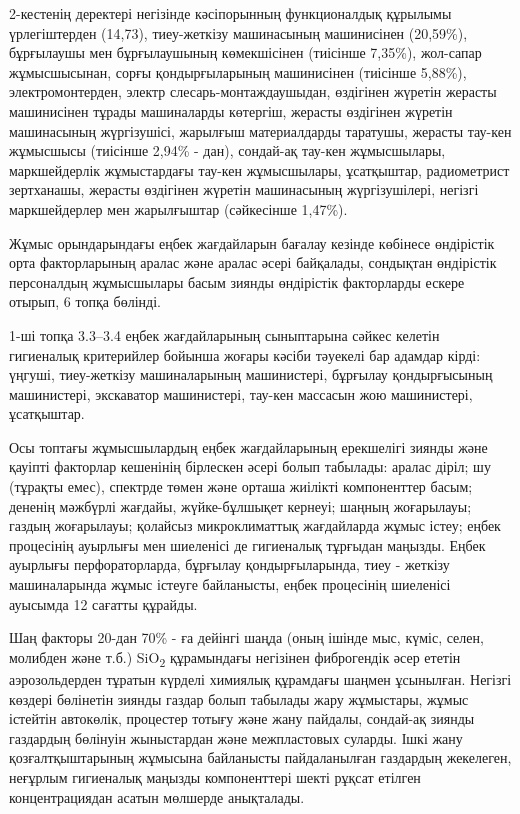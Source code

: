 2-кестенің деректері негізінде кәсіпорынның функционалдық құрылымы
үрлегіштерден (14,73), тиеу-жеткізу машинасының машинисінен (20,59\%),
бұрғылаушы мен бұрғылаушының көмекшісінен (тиісінше 7,35\%), жол-сапар
жұмысшысынан, сорғы қондырғыларының машинисінен (тиісінше 5,88\%),
электромонтерден, электр слесарь-монтаждаушыдан, өздігінен жүретін
жерасты машинисінен тұрады машиналарды көтергіш, жерасты өздігінен
жүретін машинасының жүргізушісі, жарылғыш материалдарды таратушы,
жерасты тау-кен жұмысшысы (тиісінше 2,94\% - дан), сондай-ақ тау-кен
жұмысшылары, маркшейдерлік жұмыстардағы тау-кен жұмысшылары, ұсатқыштар,
радиометрист зертханашы, жерасты өздігінен жүретін машинасының
жүргізушілері, негізгі маркшейдерлер мен жарылғыштар (сәйкесінше
1,47\%).

Жұмыс орындарындағы еңбек жағдайларын бағалау кезінде көбінесе
өндірістік орта факторларының аралас және аралас әсері байқалады,
сондықтан өндірістік персоналдың жұмысшылары басым зиянды өндірістік
факторларды ескере отырып, 6 топқа бөлінді.

1-ші топқа 3.3--3.4 еңбек жағдайларының сыныптарына сәйкес келетін
гигиеналық критерийлер бойынша жоғары кәсіби тәуекелі бар адамдар кірді:
үңгуші, тиеу-жеткізу машиналарының машинистері, бұрғылау қондырғысының
машинистері, экскаватор машинистері, тау-кен массасын жою машинистері,
ұсатқыштар.

Осы топтағы жұмысшылардың еңбек жағдайларының ерекшелігі зиянды және
қауіпті факторлар кешенінің бірлескен әсері болып табылады: аралас
діріл; шу (тұрақты емес), спектрде төмен және орташа жиілікті
компоненттер басым; дененің мәжбүрлі жағдайы, жүйке-бұлшықет кернеуі;
шаңның жоғарылауы; газдың жоғарылауы; қолайсыз микроклиматтық
жағдайларда жұмыс істеу; еңбек процесінің ауырлығы мен шиеленісі де
гигиеналық тұрғыдан маңызды. Еңбек ауырлығы перфораторларда, бұрғылау
қондырғыларында, тиеу - жеткізу машиналарында жұмыс істеуге байланысты,
еңбек процесінің шиеленісі ауысымда 12 сағатты құрайды.

Шаң факторы 20-дан 70\% - ға дейінгі шаңда (оның ішінде мыс, күміс,
селен, молибден және т.б.) SiO\textsubscript{2} құрамындағы негізінен
фиброгендік әсер ететін аэрозольдерден тұратын күрделі химиялық
құрамдағы шаңмен ұсынылған. Негізгі көздері бөлінетін зиянды газдар
болып табылады жару жұмыстары, жұмыс істейтін автокөлік, процестер
тотығу және жану пайдалы, сондай-ақ зиянды газдардың бөлінуін
жыныстардан және межпластовых суларды. Ішкі жану қозғалтқыштарының
жұмысына байланысты пайдаланылған газдардың жекелеген, неғұрлым
гигиеналық маңызды компоненттері шекті рұқсат етілген концентрациядан
асатын мөлшерде анықталады.

